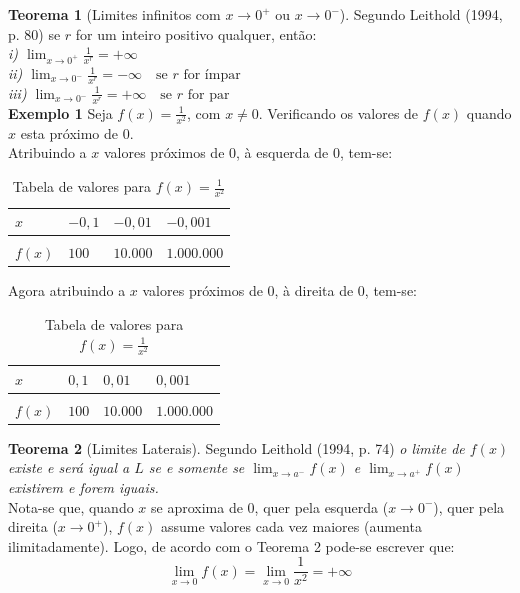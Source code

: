 \textbf{Teorema 1}
(Limites infinitos com $x \to 0^+$ ou $x \to 0^-$). Segundo Leithold (1994, p. 80) se $r$ for um inteiro positivo qualquer, então:\\
\textit{i) $\displaystyle \lim_{x \to 0^+} \frac{1}{x^r} = + \infty$\\
ii) $\displaystyle \lim_{x \to 0^-} \frac{1}{x^r} = - \infty \quad\textrm{se $r$ for ímpar} $\\
iii) $\displaystyle \lim_{x \to 0^-} \frac{1}{x^r} = + \infty \quad \textrm{se $r$ for par}$}\\


\textbf{Exemplo 1} Seja $\displaystyle f(x) = \frac{1}{x^2}$, com $x \neq 0$. Verificando os valores de $f(x)$ quando $x$ esta próximo de $0$.\\
Atribuindo a $x$ valores próximos de $0$, à esquerda de $0$, tem-se:

\begin{table}[H]
\centering
\caption{Tabela de valores para $\displaystyle f(x) = \frac{1}{x^2}$}
\label{tab:tab2}
\smallskip
\begin{tabular}{l|l|l|l}
\hline
 $x$ & $-0,1$ & $-0,01$ & $-0,001$ \\[0.5ex]
\hline
&&&\\[-2ex]
$f(x)$ & $100$ &  $10.000$ &  $1.000.000$\\[0.5ex]
\hline
\end{tabular}
\end{table}
Agora atribuindo a $x$ valores próximos  de $0$,  à direita de $0$, tem-se:

\begin{table}[H]
\centering
\caption{Tabela de valores para $\displaystyle f(x) = \frac{1}{x^2}$}
\label{tab:tab2}
\smallskip
\begin{tabular}{l|l|l|l}
\hline
 $x$ & $0,1$ & $0,01$ & $0,001$ \\[0.5ex]
\hline
&&&\\[-2ex]
$f(x)$ & $100$ &  $10.000$ &  $1.000.000$\\[0.5ex]
\hline
\end{tabular}
\end{table}

\textbf{Teorema 2}
(Limites Laterais). Segundo Leithold (1994, p. 74) \textit{  o limite de $f(x)$  existe e será igual a $L$ se e somente se $\displaystyle \lim_{x \to a^-} f(x)$ e $\displaystyle \lim_{x \to a^+} f(x)$ existirem e forem iguais.}\\

Nota-se que, quando $x$  se aproxima de $0$, quer pela esquerda ($x \to 0^-$), quer pela direita ($x \to 0^+$), $f(x)$ assume valores cada vez maiores (aumenta ilimitadamente). Logo, de acordo com o Teorema 2 pode-se escrever que:
$$
\displaystyle \lim_{x \to 0} f(x) = \lim_{x \to 0} \frac{1}{x^2} = + \infty
$$

